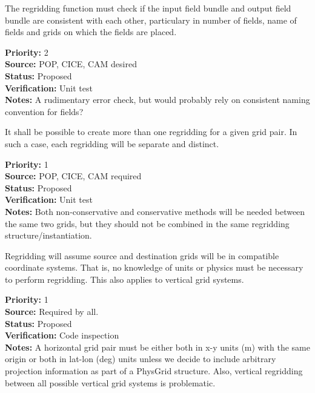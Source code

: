 
The regridding function must check if the input field bundle and output field
bundle are consistent with each other, particulary in number of fields, name of
fields and grids on which the fields are placed.

\begin{reqlist}
{\bf Priority:} 2 \\
{\bf Source:} POP, CICE, CAM desired \\
{\bf Status:} Proposed \\
{\bf Verification:} Unit test \\
{\bf Notes:} A rudimentary error check, but would probably rely on
             consistent naming convention for fields?
\end{reqlist}


It shall be possible to create more than one regridding for a given grid
pair.  In such a case, each regridding will be separate and distinct.

\begin{reqlist}
{\bf Priority:} 1 \\
{\bf Source:} POP, CICE, CAM required \\
{\bf Status:} Proposed \\
{\bf Verification:} Unit test \\
{\bf Notes:} Both non-conservative and conservative methods will be needed
             between the same two grids, but they should not be combined in the
             same regridding structure/instantiation.
\end{reqlist}


Regridding will assume source and destination grids will be
in compatible coordinate systems.  That is, no knowledge of units or 
physics must be necessary to perform regridding.
This also applies to vertical grid systems.

\begin{reqlist}
{\bf Priority:} 1 \\
{\bf Source:} Required by all. \\
{\bf Status:} Proposed \\
{\bf Verification:} Code inspection  \\
{\bf Notes:} A horizontal grid pair must be either both in x-y units (m) 
             with the same origin or both in lat-lon (deg) units unless 
             we decide to include arbitrary projection information as part 
             of a PhysGrid structure. 
             Also, vertical regridding between all possible vertical grid 
             systems is problematic.
\end{reqlist}

